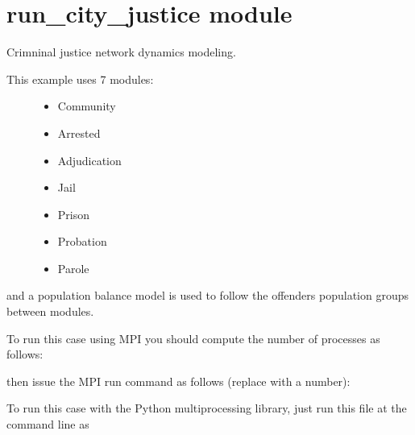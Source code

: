 \documentclass[letterpaper,10pt,openany,oneside,english]{sphinxmanual}
\begin{document}
\section{run\_city\_justice module}
\label{\detokenize{examples_rst/run_city_justice:module-run_city_justice}}\label{\detokenize{examples_rst/run_city_justice:run-city-justice-module}}\label{\detokenize{examples_rst/run_city_justice::doc}}
Crimninal justice network dynamics modeling.
\begin{description}
\item[{This example uses 7 modules:}] \leavevmode\begin{itemize}
\item {} 
Community

\item {} 
Arrested

\item {} 
Adjudication

\item {} 
Jail

\item {} 
Prison

\item {} 
Probation

\item {} 
Parole

\end{itemize}

\end{description}

and a population balance model is used to follow the offenders population
groups between modules.

To run this case using MPI you should compute the number of
processes as follows:
\begin{quote}

\end{quote}

then issue the MPI run command as follows (replace  with a number):
\begin{quote}

\end{quote}

To run this case with the Python multiprocessing library, just run this file at the
command line as
\begin{quote}

\end{quote}
\end{document}
